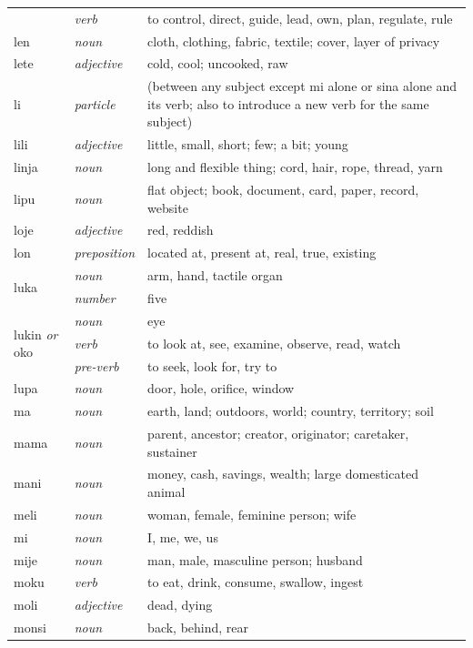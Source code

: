 \documentclass[14pt, a4paper]{extreport}
\begin{document}
\begin{longtable}{llp{10cm}}
  & \textit{verb} & to control, direct, guide, lead, own, plan, regulate, rule \\
  len & \textit{noun} & cloth, clothing, fabric, textile; cover, layer of privacy \\
  lete & \textit{adjective} & cold, cool; uncooked, raw \\
  li & \textit{particle} & (between any subject except mi alone or sina alone and its verb; also to introduce a new verb for the same subject) \\
  lili & \textit{adjective} & little, small, short; few; a bit; young \\
  linja & \textit{noun} & long and flexible thing; cord, hair, rope, thread, yarn \\
  lipu & \textit{noun} & flat object; book, document, card, paper, record, website \\
  loje & \textit{adjective} & red, reddish \\
  lon & \textit{preposition} & located at, present at, real, true, existing \\
  \multirow[t]{2}{*}{luka} & \textit{noun} & arm, hand, tactile organ \\
  & \textit{number} & five \\
  \multirow[t]{3}{*}{lukin \textit{or} oko} & \textit{noun} & eye \\
  & \textit{verb} & to look at, see, examine, observe, read, watch \\
  & \textit{pre-verb} & to seek, look for, try to \\
  lupa & \textit{noun} & door, hole, orifice, window \\
  ma & \textit{noun} & earth, land; outdoors, world; country, territory; soil \\
  mama & \textit{noun} & parent, ancestor; creator, originator; caretaker, sustainer \\
  mani & \textit{noun} & money, cash, savings, wealth; large domesticated animal \\
  meli & \textit{noun} & woman, female, feminine person; wife \\
  mi & \textit{noun} & I, me, we, us \\
  mije & \textit{noun} & man, male, masculine person; husband \\
  moku & \textit{verb} & to eat, drink, consume, swallow, ingest \\
  moli & \textit{adjective} & dead, dying \\
  monsi & \textit{noun} & back, behind, rear \\

\end{longtable}
\end{document}
